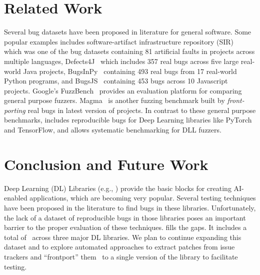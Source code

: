 \documentclass[sigconf,screen]{acmart}
\begin{document}

\section{Related Work} 

Several bug datasets have been proposed in literature for general
software. Some popular examples includes software-artifact
infrastructure repository (SIR)~\cite{do2005supporting} which was one
of the bug datasets containing 81 artificial faults in projects across
multiple languages, Defects4J~\cite{just2014defects4j} which includes
357 real bugs across five large real-world Java projects,
BugsInPy~\cite{widyasari2020bugsinpy} containing 493 real bugs from 17
real-world Python programs, and BugsJS~\cite{vancsics2020relationship}
containing 453 bugs across 10 Javascript projects.
%
Google's FuzzBench~\cite{metzman2021fuzzbench} provides an evaluation platform
for comparing general purpose fuzzers. Magma~\cite{hazimeh2020magma} is another
fuzzing benchmark built by \emph{front-porting} real bugs in latest version of
projects. In contrast to these general purpose benchmarks, \tname includes
reproducible bugs for Deep Learning libraries like PyTorch and TensorFlow, and
allows systematic benchmarking for DLL fuzzers. 


\section{Conclusion and Future Work}
Deep Learning (DL) Libraries (e.g., \torch) provide the basic blocks
for creating AI-enabled applications, which are becoming very
popular. Several testing techniques have been proposed in the
literature to find bugs in these libraries. Unfortunately, the lack of
a dataset of reproducible bugs in those libraries poses an important
barrier to the proper evaluation of these techniques. \tname{} fills
the gaps. It includes a total of \numbugs\ across three major DL
libraries. We plan to continue expanding this dataset and to explore
automated approaches to extract patches from issue trackers and
``frontport'' them~\cite{hazimeh2020magma} to a single version of the
library to facilitate testing.
\end{document}
